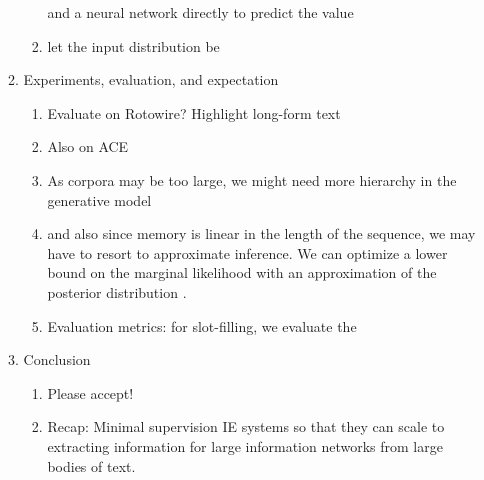 \documentclass[11pt]{article}
\begin{document}
\begin{enumerate}
\begin{enumerate}
\begin{enumerate}
            and a neural network directly to predict the value
        \item let the input distribution be 
        \end{enumerate}
    \item Experiments, evaluation, and expectation
        \begin{enumerate}
        \item Evaluate on Rotowire? Highlight long-form text
        \item Also on ACE
        \item As corpora may be too large, we might need more hierarchy in the generative model
        \item and also since memory is linear in the length of the sequence, we may have
            to resort to approximate inference. We can optimize a lower bound
            on the marginal likelihood with an approximation of the
            posterior distribution \citep{deng2018attn}.
        \item Evaluation metrics: for slot-filling, we evaluate 
            the 
        \end{enumerate}
    \item Conclusion
        \begin{enumerate}
        \item Please accept!
        \item Recap: Minimal supervision IE systems so that they can scale to
            extracting information for large information networks from large bodies of text.
        \end{enumerate}
    \end{enumerate}
\end{enumerate}

\newpage


\end{document}
